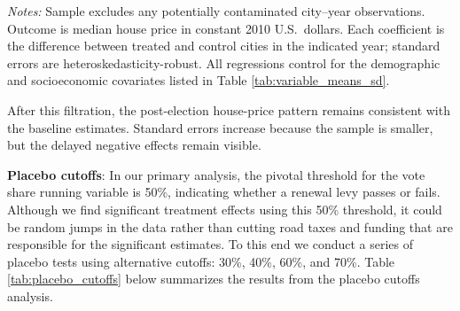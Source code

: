 \begin{table}[H]
\begin{threeparttable}
\begin{tabular}{p{4.5cm}ccccccc}
    \bottomrule
  \end{tabular}
  \begin{tablenotes}[flushleft]
    \small
    \item \textit{Notes:} Sample excludes any potentially contaminated city–year observations. Outcome is median house price in constant 2010 U.S.\ dollars. Each coefficient is the difference between treated and control cities in the indicated year; standard errors are heteroskedasticity-robust. All regressions control for the demographic and socioeconomic covariates listed in Table \ref{tab:variable_means_sd}.
  \end{tablenotes}
  \end{threeparttable}
\end{table}
























After this filtration, the post-election house-price pattern remains consistent with the baseline estimates. Standard errors increase because the sample is smaller, but the delayed negative effects remain visible.

\textbf{Placebo cutoffs}: In our primary analysis, the pivotal threshold for the vote share running variable is 50\%, indicating whether a renewal levy passes or fails.  Although we find significant treatment effects using this 50\% threshold, it could be random jumps in the data rather than cutting road taxes and funding that are responsible for the significant estimates.  To this end we conduct a series of placebo tests using alternative cutoffs: 30\%, 40\%, 60\%, and 70\%. Table \ref{tab:placebo_cutoffs} below summarizes the results from the placebo cutoffs analysis.

